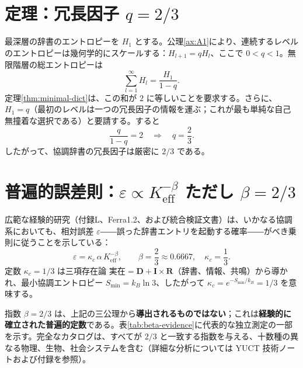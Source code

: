 \documentclass[12pt,a4paper]{article}
\begin{document}
	
	\section{定理：冗長因子 \(q = 2/3\)}
	
	最深層の辞書のエントロピーを \(H_1\) とする。公理\ref{ax:A1}により、連続するレベルのエントロピーは幾何学的にスケールする：\(H_{l+1} = q H_l\)、ここで \(0 < q < 1\)。無限階層の総エントロピーは
	\[
	\sum_{l=1}^{\infty} H_l = \frac{H_1}{1-q}.
	\]
	定理\ref{thm:minimal-dict}は、この和が \(2\) に等しいことを要求する。さらに、\(H_1 = q\)（最初のレベルは一つの冗長因子の情報を運ぶ；これが最も単純な自己無撞着な選択である）と要請する。すると
	\begin{equation}
		\frac{q}{1-q} = 2 \quad\Longrightarrow\quad \boxed{q = \frac{2}{3}}.
		\label{eq:q}
	\end{equation}
	したがって、協調辞書の冗長因子は厳密に \(2/3\) である。
	
	\section{普遍的誤差則：\(\varepsilon \propto K_{\mathrm{eff}}^{-\beta}\) ただし \(\beta = 2/3\)}
	
	広範な経験的研究（付録L、Ferra1.2、および統合検証文書）は、いかなる協調系においても、相対誤差 \(\varepsilon\)――誤った辞書エントリを起動する確率――がべき乗則に従うことを示している：
	\begin{equation}
		\boxed{\varepsilon = \kappa_c \, \alpha \, K_{\mathrm{eff}}^{-\beta}, \qquad \beta = \frac{2}{3} \approx 0.6667,\quad \kappa_c = \frac{1}{3}}.
		\label{eq:error-law}
	\end{equation}
	定数 \(\kappa_c = 1/3\) は三項存在論 \(\text{実在} = \mathbf{D} + \mathbf{I} \times \mathbf{R}\)（辞書、情報、共鳴）から導かれ、最小協調エントロピー \(S_{\min} = k_B \ln 3\)、したがって \(\kappa_c = e^{-S_{\min}/k_B} = 1/3\) を意味する。
	
	指数 \(\beta = 2/3\) は、上記の三公理から\textbf{導出されるものではない}；これは\textbf{経験的に確立された普遍的定数}である。表\ref{tab:beta-evidence}に代表的な独立測定の一部を示す。完全なカタログは、すべてが \(2/3\) と一致する指数を与える、十数種の異なる物理、生物、社会システムを含む（詳細な分析については YUCT 技術ノートおよび付録を参照）。
	
\end{document}
